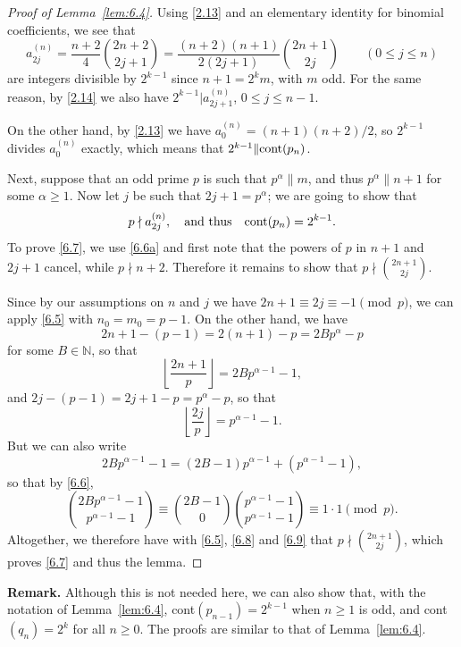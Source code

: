 \documentclass{amsart}
\theoremstyle{plain}
\numberwithin{equation}{section}
\begin{document}
\begin{proof}[Proof of Lemma~\ref{lem:6.4}]
Using \eqref{2.13} and an elementary identity for binomial coefficients, we
see that
\begin{equation}\label{6.6a}
a_{2j}^{(n)}=\frac{n+2}{4}\binom{2n+2}{2j+1}
=\frac{(n+2)(n+1)}{2(2j+1)}\binom{2n+1}{2j}\qquad(0\leq j\leq n)
\end{equation}
are integers divisible by $2^{k-1}$ since $n+1=2^km$, with $m$ odd.
For the same reason, by \eqref{2.14} we also have $2^{k-1}|a_{2j+1}^{(n)}$,
$0\leq j\leq n-1$.

On the other hand, by \eqref{2.13} we have $a_0^{(n)}=(n+1)(n+2)/2$, so 
$2^{k-1}$ divides $a_0^{(n)}$ exactly, which means that 
$2^{k-1}\|{\rm cont}(p_n)$.

Next, suppose that an odd prime $p$ is such that $p^\alpha\|m$, and thus
$p^\alpha\|n+1$ for some $\alpha\geq 1$. Now let $j$ be such that 
$2j+1=p^\alpha$; we are going to show that
\begin{equation}\label{6.7}
p\nmid a_{2j}^{(n)},\quad\hbox{and thus}\quad {\rm cont}(p_n)=2^{k-1}.
\end{equation}
To prove \eqref{6.7}, we use \eqref{6.6a} and first note that the powers of $p$
in $n+1$ and $2j+1$ cancel, while $p\nmid n+2$. Therefore it remains to show
that $p\nmid\binom{2n+1}{2j}$.

Since by our assumptions on $n$ and $j$ we have $2n+1\equiv 2j\equiv-1\pmod{p}$,
we can apply \eqref{6.5} with $n_0=m_0=p-1$. On the other
hand, we have
\[
2n+1-(p-1) = 2(n+1)-p = 2Bp^\alpha-p
\]
for some $B\in{\mathbb N}$, so that
\begin{equation}\label{6.8}
\left\lfloor\frac{2n+1}{p}\right\rfloor = 2Bp^{\alpha-1}-1,
\end{equation}
and $2j-(p-1)=2j+1-p=p^\alpha-p$, so that
\begin{equation}\label{6.9}
\left\lfloor\frac{2j}{p}\right\rfloor = p^{\alpha-1}-1.
\end{equation}
But we can also write
\[
2Bp^{\alpha-1}-1 = (2B-1)p^{\alpha-1}+(p^{\alpha-1}-1),
\]
so that by \eqref{6.6},
\[
\binom{2Bp^{\alpha-1}-1}{p^{\alpha-1}-1} \equiv
\binom{2B-1}{0}\binom{p^{\alpha-1}-1}{p^{\alpha-1}-1}\equiv 1\cdot 1\pmod{p}.
\]
Altogether, we therefore have with \eqref{6.5}, \eqref{6.8} and \eqref{6.9}
that $p\nmid\binom{2n+1}{2j}$, which proves \eqref{6.7} and thus the lemma.
\end{proof}

\noindent
{\bf Remark.} Although this is not needed here, we can also show that, with 
the notation of Lemma~\ref{lem:6.4}, cont$(p_{n-1})=2^{k-1}$ when $n\geq 1$ is
odd, and cont$(q_n)=2^k$ for all $n\geq 0$. The proofs are similar to that of
Lemma~\ref{lem:6.4}.
\end{document}
